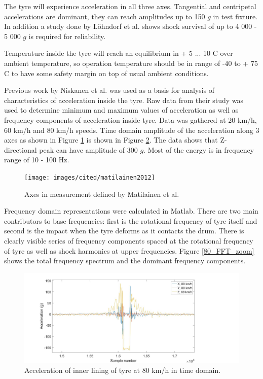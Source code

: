The tyre will experience acceleration in all three axes\cite{Niskanen2014}. Tangential and centripetal accelerations are dominant, they can reach amplitudes up to 150 $g$ in test fixture. In addition a study done by Löhndorf et al. \cite{Lohndorf2007} shows shock survival of up to 4 000 - 5 000 $g$ is required for reliability. 

Temperature inside the tyre will reach an equilibrium in + 5 ... 10 \degree C over ambient temperature, so operation temperature should be in range of -40 to + 75 \degree C to have some safety margin on top of usual ambient conditions. 

Previous work by Niskanen et al. \cite{Niskanen2014} was used as a basis for analysis of characteristics of acceleration inside the tyre. Raw data from their study was used to determine minimum and maximum values of acceleration as well as frequency components of acceleration inside tyre. Data was gathered at 20 km/h, 60 km/h and 80 km/h speeds. Time domain amplitude of the acceleration along 3 axes as shown in Figure \ref{tyre_axes} is shown in Figure \ref{80_TD}. The data shows that Z-directional peak can have amplitude of 300 $g$. Most of the energy is in frequency range of 10 - 100 Hz.

\begin{figure}[htb]
\begin{center}
\texttt{[image: images/cited/matilainen2012]}
\end{center}
\caption{Axes in measurement defined by Matilainen et al. \cite{Matilainen2012}}
\label{tyre_axes}
\end{figure}

Frequency domain representations were calculated in Matlab. There are two main contributors to base frequencies: first is the rotational frequency of tyre itself and second is the impact when the tyre deforms as it contacts the drum. There is clearly visible series of frequency components spaced at the rotational frequency of tyre as well as shock harmonics at upper frequencies. Figure \ref{80_FFT_zoom} shows the total frequency spectrum and the dominant frequency components.

\begin{figure}[htb]
\begin{center}
\includegraphics[width=\columnwidth]{images/matlab_figures/80kmh_timedomain_combined}
\end{center}
\caption{Acceleration of inner lining of tyre at 80 km/h in time domain.}
\label{80_TD}
\end{figure}

